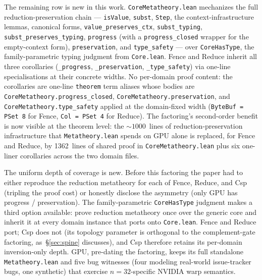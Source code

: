 \documentclass[acmsmall,screen,review,anonymous,nonacm]{acmart}
\newcommand{\CoreHasType}{\texttt{CoreHasType}}
\begin{document}
The remaining row is new in this work. \texttt{CoreMetatheory.lean} mechanizes the full reduction-preservation chain --- \texttt{isValue}, \texttt{subst}, \texttt{Step}, the context-infrastructure lemmas, canonical forms, \texttt{value\_preserves\_ctx}, \texttt{subst\_typing}, \texttt{subst\_preserves\_typing}, \texttt{progress} (with a \texttt{progress\_closed} wrapper for the empty-context form), \texttt{preservation}, and \texttt{type\_safety} --- over \CoreHasType{}, the family-parametric typing judgment from \texttt{Core.lean}. Fence and Reduce inherit all three corollaries (\texttt{\_progress}, \texttt{\_preservation}, \texttt{\_type\_safety}) via one-line specialisations at their concrete widths. No per-domain proof content: the corollaries are one-line \texttt{theorem} term aliases whose bodies are \texttt{CoreMetatheory.progress\_closed}, \texttt{CoreMetatheory.preservation}, and \texttt{CoreMetatheory.type\_safety} applied at the domain-fixed width (\texttt{ByteBuf = PSet 8} for Fence, \texttt{Col = PSet 4} for Reduce). The factoring's second-order benefit is now visible at the theorem level: the ${\sim}1000$~lines of reduction-preservation infrastructure that \texttt{Metatheory.lean} spends on GPU alone is replaced, for Fence and Reduce, by 1362~lines of shared proof in \texttt{CoreMetatheory.lean} plus six one-liner corollaries across the two domain files.

The uniform depth of coverage is new. Before this factoring the paper had to either reproduce the reduction metatheory for each of Fence, Reduce, and Csp (tripling the proof cost) or honestly disclose the asymmetry (only GPU has progress / preservation). The family-parametric \CoreHasType{} judgment makes a third option available: prove reduction metatheory once over the generic core and inherit it at every domain instance that ports onto \texttt{Core.lean}. Fence and Reduce port; Csp does not (its topology parameter is orthogonal to the complement-gate factoring, as~\S\ref{sec:spine} discusses), and Csp therefore retains its per-domain inversion-only depth. GPU, pre-dating the factoring, keeps its full standalone \texttt{Metatheory.lean} and five bug witnesses (four modeling real-world issue-tracker bugs, one synthetic) that exercise $n = 32$-specific NVIDIA warp semantics.
\end{document}
